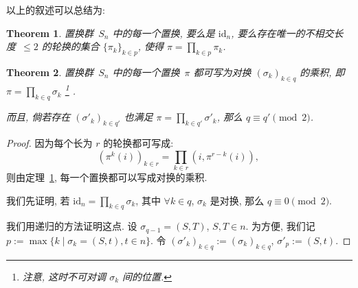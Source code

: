 \documentclass[openany]{ctexbook}
\theoremstyle{plain}
\newtheorem{theorem}{Theorem}[section] %
\theoremstyle{definition}
\newcommand*{\id}{\mathrm{id}} %
\begin{document}
以上的叙述可以总结为:
\begin{theorem}\label{theorem: 置换的轮换分解}
	置换群~$S_n$ 中的每一个置换, 要么是 $\id_n$, 要么存在唯一的不相交长度~$\leq 2$ 的轮换的集合 $\{\pi_k\}_{k \in p}$, 使得 $\pi = \prod_{k \in p} \pi_k$.
\end{theorem}

\begin{theorem}\label{theorem: 置换的对换分解}
	置换群~$S_n$ 中的每一个置换~$\pi$ 都可写为对换 $(\sigma_k)_{k \in q}$ 的乘积, 即
	$\pi = \prod_{k \in q} \sigma_k$%
		\footnote{注意, 这时不可对调 $\sigma_k$ 间的位置. }%
		.
	
	而且, 倘若存在 $(\sigma'_k)_{k \in q'}$ 也满足 $\pi = \prod_{k \in q'} \sigma'_k$, 那么 $q \equiv q' \pmod 2$.
\end{theorem}
\begin{proof}
	因为每个长为 $r$ 的轮换都可写成:
	\begin{equation*}
		(\pi^k(i))_{k \in r} = \prod_{k \in r} (i, \pi^{r - k}(i)),\,
	\end{equation*}
	则由定理~\ref{theorem: 置换的轮换分解}, 每一个置换都可以写成对换的乘积.

	我们先证明, 若 $\id_n = \prod_{k \in q} \sigma_k$, 其中 $\forall k \in q$, $\sigma_k$ 是对换, 那么 $q \equiv 0 \pmod 2$.

	我们用递归的方法证明这点. 
	设 $\sigma_{q - 1} = (S, T)$, $S, T \in n$. 
	为方便, 我们记 $p := \max\{ k \mid \sigma_k = (S,t), t\in n\}$.
	令 $(\sigma'_k)_{k \in q} := (\sigma_k)_{k \in q}$, $\sigma'_p := (S, t)$.


\end{proof}
\end{document}
